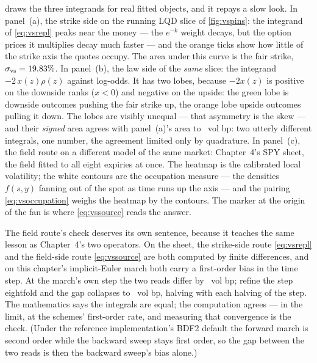  draws the three integrands for real fitted objects,
and it repays a slow look.  In panel~(a), the strike side on the
running LQD slice of \cref{fig:vspins}: the integrand of
\eqref{eq:vsrepl} peaks near the money --- the $e^{-k}$ weight decays,
but the option prices it multiplies decay much faster --- and the
orange ticks show how little of the strike axis the quotes occupy.
The area under this curve is the fair strike,
$\sigma_{\rm vs}=19.83\%$.  In panel~(b), the law side of
the \emph{same} slice: the integrand $-2\,x(z)\rho(z)$ against
log-odds.  It has two lobes, because $-2x(z)$ is positive on the
downside ranks ($x<0$) and negative on the upside: the green lobe is
downside outcomes pushing the fair strike up, the orange lobe upside
outcomes pulling it down.  The lobes are visibly unequal --- that
asymmetry is the skew --- and their \emph{signed} area agrees with
panel~(a)'s area to \MacVsAgreeRankBp\ vol bp: two utterly different
integrals, one number, the agreement limited only by quadrature.  In
panel~(c), the field route on a different model of the same market:
Chapter~4's SPY sheet, the field fitted to all eight expiries at
once.  The heatmap is the calibrated
local volatility; the white contours are the occupation measure ---
the densities $f(s,y)$ fanning out of the spot as time runs up the
axis --- and the pairing \eqref{eq:vsoccupation} weighs the heatmap by
the contours.  The marker at the origin of the fan is where
\eqref{eq:vssource} reads the answer.

The field route's check deserves its own sentence, because it teaches
the same lesson as Chapter~4's two operators.  On the sheet, the
strike-side route \eqref{eq:vsrepl} and the field-side route
\eqref{eq:vssource} are both computed by finite differences, and on
this chapter's implicit-Euler march both
carry a first-order bias in the time step.  At the march's own step
the two reads differ by \MacVsAgreeFieldCoarseBp\ vol bp; refine the
step eightfold and the gap collapses to \MacVsAgreeFieldBp\ vol bp,
halving with each halving of the step.  The mathematics says the
integrals are equal; the computation agrees --- in the limit, at the
schemes' first-order rate, and measuring that convergence is the
check.  (Under the reference implementation's BDF2 default the
forward march is second order while the backward sweep stays first
order, so the gap between the two reads is then the backward sweep's
bias alone.)


